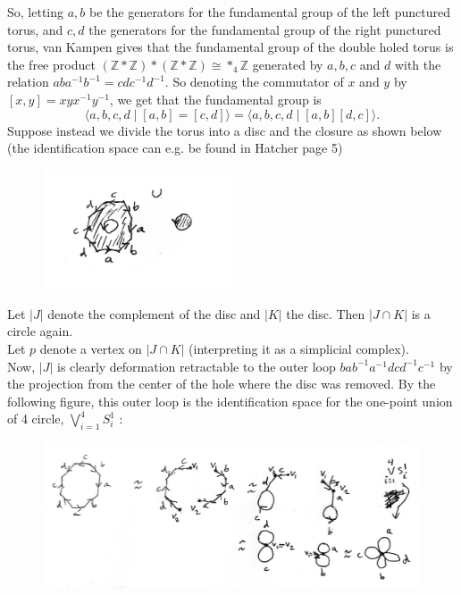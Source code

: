 \documentclass[a4paper]{article}
\begin{document}
      So, letting $a,b$ be the generators for the fundamental group of the left
      punctured torus, and $c,d$ the generators for the fundamental group of
      the right punctured torus, van Kampen gives that the fundamental group of
      the double holed torus is the free product
      $\left( \mathbb{Z} * \mathbb{Z} \right) *
      \left( \mathbb{Z} * \mathbb{Z} \right) \cong *_{4} \mathbb{Z}
      $ generated by $a,b,c$ and  $d$ with
      the relation
      $ab a^{-1}b^{-1} = cdc^{-1}d^{-1}$.
      So denoting the commutator of $x$ and $y$ by
      $\left[ x,y \right] = xyx^{-1}y^{-1}$, we get that the fundamental group is
      \[
      \langle a,b,c,d  \mid \left[ a,b \right] = \left[ c,d \right] 
       \rangle 
       = \langle a,b,c,d  \mid \left[ a,b \right] \left[ d,c \right]  \rangle.
      \] 
      Suppose instead we divide the torus into a disc and the closure as shown
      below (the identification space can e.g. be found in Hatcher page 5)

      \begin{figure}[H]
          \centering
          \includegraphics[width=0.5\textwidth]{13.jpeg}
          \label{fig:13-jpeg}
      \end{figure}
      
      Let $\left| J \right| $ denote the complement of the disc and
      $\left| K \right| $ the disc. Then
      $\left| J \cap K \right| $ is a circle again.\\
      Let $p$ denote a vertex on $\left| J \cap K \right| $ (interpreting
      it as a simplicial complex).\\
      Now, $\left| J \right| $ is clearly deformation retractable to the
      outer loop  $bab^{-1}a^{-1}dcd^{-1}c^{-1}$ by the projection from the
      center of the hole where the disc was removed. By the following figure,
      this outer loop is the identification space for the one-point union of
      4 circle, $\bigvee_{i=1}^{4}S_i^{1}$ :

      \begin{figure}[H]
          \centering
          \includegraphics[width=1\textwidth]{14.jpeg}
          \label{fig:14-jpeg}
      \end{figure}
\end{document}
